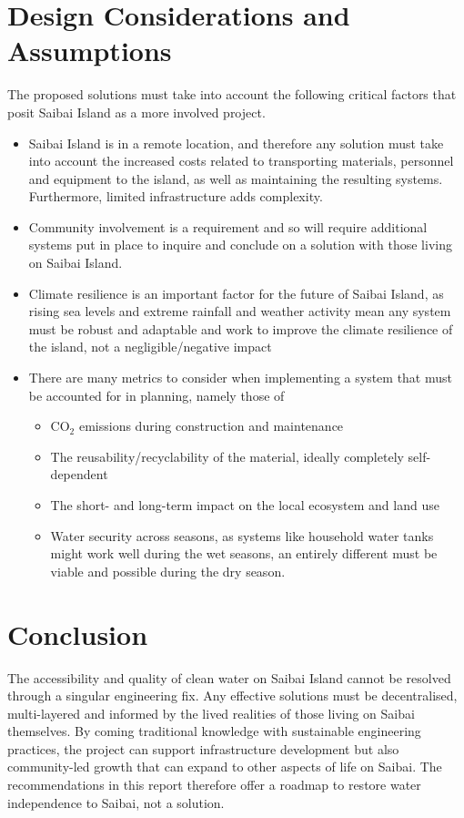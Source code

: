 \documentclass[a4paper,12pt]{report}
\begin{document}
\section{Design Considerations and Assumptions}

The proposed solutions must take into account the following critical factors that posit Saibai Island as a more involved project.

\begin{itemize}
  \item Saibai Island is in a remote location, and therefore any solution must take into account the increased costs related to transporting materials, personnel and equipment to the island, as well as maintaining the resulting systems. Furthermore, limited infrastructure adds complexity.
  
  \item Community involvement is a requirement and so will require additional systems put in place to inquire and conclude on a solution with those living on Saibai Island.
  
  \item Climate resilience is an important factor for the future of Saibai Island, as rising sea levels and extreme rainfall and weather activity mean any system must be robust and adaptable and work to improve the climate resilience of the island, not a negligible/negative impact
  
  \item There are many metrics to consider when implementing a system that must be accounted for in planning, namely those of
  \begin{itemize}
    \item CO$_2$ emissions during construction and maintenance
    \item The reusability/recyclability of the material, ideally completely self-dependent
    \item The short- and long-term impact on the local ecosystem and land use
    \item Water security across seasons, as systems like household water tanks might work well during the wet seasons, an entirely different must be viable and possible during the dry season.
  \end{itemize}
\end{itemize}

\section{Conclusion}

The accessibility and quality of clean water on Saibai Island cannot be resolved through a singular engineering fix. Any effective solutions must be decentralised, multi-layered and informed by the lived realities of those living on Saibai themselves. By coming traditional knowledge with sustainable engineering practices, the project can support infrastructure development but also community-led growth that can expand to other aspects of life on Saibai. The recommendations in this report therefore offer a roadmap to restore water independence to Saibai, not a solution.

\newpage


\end{document}
